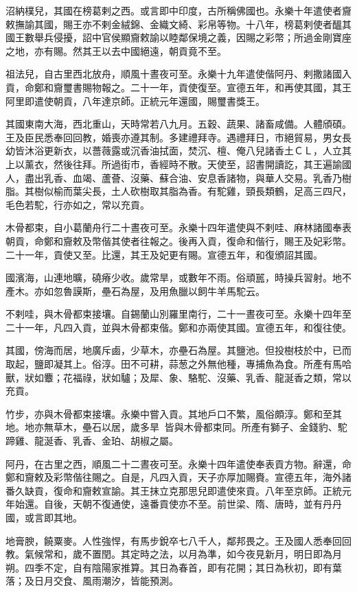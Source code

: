 \begin{pinyinscope}
沼納樸兒，其國在榜葛剌之西。或言即中印度，古所稱佛國也。永樂十年遣使者齎敕撫諭其國，賜王亦不剌金絨錦、金織文綺、彩帛等物。十八年，榜葛剌使者醞其國王數舉兵侵擾，詔中官侯顯齎敕諭以睦鄰保境之義，因賜之彩幣；所過金剛寶座之地，亦有賜。然其王以去中國絕遠，朝貢竟不至。

祖法兒，自古里西北放舟，順風十晝夜可至。永樂十九年遣使偕阿丹、剌撒諸國入貢，命鄭和齎璽書賜物報之。二十一年，貢使復至。宣德五年，和再使其國，其王阿里即遣使朝貢，八年達京師。正統元年還國，賜璽書獎王。

其國東南大海，西北重山，天時常若八九月。五穀、蔬果、諸畜咸備。人體頎碩。王及臣民悉奉回回教，婚喪亦遵其制。多建禮拜寺。遇禮拜日，市絕貿易，男女長幼皆沐浴更新衣，以薔薇露或沉香油拭面，焚沉、檀、俺八兒諸香土ＣＬ，人立其上以薰衣，然後往拜。所過街市，香經時不散。天使至，詔書開讀訖，其王遍諭國人，盡出乳香、血竭、蘆薈、沒藥、蘇合油、安息香諸物，與華人交易。乳香乃樹脂。其樹似榆而葉尖長，土人砍樹取其脂為香。有駝雞，頸長類鶴，足高三四尺，毛色若駝，行亦如之，常以充貢。

木骨都束，自小葛蘭舟行二十晝夜可至。永樂十四年遣使與不剌哇、麻林諸國奉表朝貢，命鄭和齎敕及幣偕其使者往報之。後再入貢，復命和偕行，賜王及妃彩幣。二十一年，貢使又至。比還，其王及妃更有賜。宣德五年，和復頒詔其國。

國濱海，山連地曠，磽瘠少收。歲常旱，或數年不雨。俗頑嚚，時操兵習射。地不產木。亦如忽魯謨斯，壘石為屋，及用魚臘以飼牛羊馬駝云。

不剌哇，與木骨都束接壤。自錫蘭山別羅里南行，二十一晝夜可至。永樂十四年至二十一年，凡四入貢，並與木骨都束偕。鄭和亦兩使其國。宣德五年，和復往使。

其國，傍海而居，地廣斥鹵，少草木，亦壘石為屋。其鹽池。但投樹枝於中，已而取起，鹽即凝其上。俗淳。田不可耕，蒜葱之外無他種，專捕魚為食。所產有馬哈獸，狀如麞；花福祿，狀如驢；及犀、象、駱駝、沒藥、乳香、龍涎香之類，常以充貢。

竹步，亦與木骨都束接壤。永樂中嘗入貢。其地戶口不繁，風俗頗淳。鄭和至其地。地亦無草木，壘石以居，歲多旱，皆與木骨都束同。所產有獅子、金錢豹、駝蹄雞、龍涎香、乳香、金珀、胡椒之屬。

阿丹，在古里之西，順風二十二晝夜可至。永樂十四年遣使奉表貢方物。辭還，命鄭和齎敕及彩幣偕往賜之。自是，凡四入貢，天子亦厚加賜賚。宣德五年，海外諸番久缺貢，復命和齎敕宣諭。其王抹立克那思兒即遣使來貢。八年至京師。正統元年始還。自後，天朝不復通使，遠番貢使亦不至。前世梁、隋、唐時，並有丹丹國，或言即其地。

地膏腴，饒粟麥。人性強悍，有馬步銳卒七八千人，鄰邦畏之。王及國人悉奉回回教。氣候常和，歲不置閏。其定時之法，以月為準，如今夜見新月，明日即為月朔。四季不定，自有陰陽家推算。其日為春首，即有花開；其日為秋初，即有葉落；及日月交食、風雨潮汐，皆能預測。


\end{pinyinscope}
